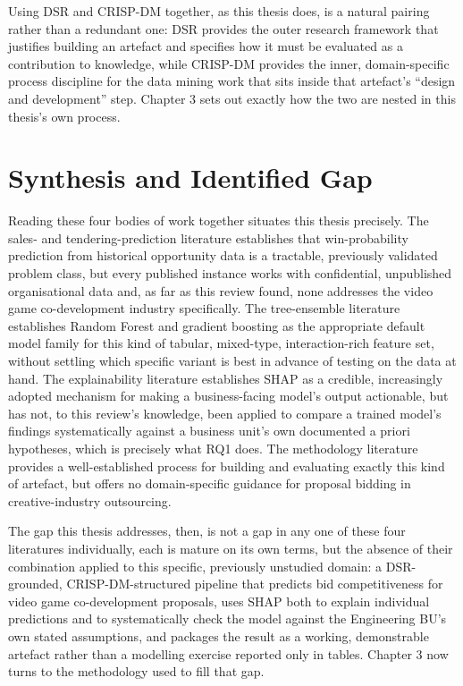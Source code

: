 Using DSR and CRISP-DM together, as this thesis does, is a natural
pairing rather than a redundant one: DSR provides the outer research
framework that justifies building an artefact and specifies how it must
be evaluated as a contribution to knowledge, while CRISP-DM provides the
inner, domain-specific process discipline for the data mining work that
sits inside that artefact's ``design and development'' step. Chapter 3
sets out exactly how the two are nested in this thesis's own process.

\hypertarget{synthesis-and-identified-gap}{%
\section{Synthesis and Identified
Gap}\label{synthesis-and-identified-gap}}

Reading these four bodies of work together situates this thesis
precisely. The sales- and tendering-prediction literature
\citep{yan2015sales, zahid2021predicting, rezazadeh2020generalized}
establishes that win-probability prediction from historical opportunity
data is a tractable, previously validated problem class, but every
published instance works with confidential, unpublished organisational
data and, as far as this review found, none addresses the video game
co-development industry specifically. The tree-ensemble literature
\citep{breiman2001random, friedman2001greedy, chen2016xgboost}
establishes Random Forest and gradient boosting as the appropriate
default model family for this kind of tabular, mixed-type,
interaction-rich feature set, without settling which specific variant is
best in advance of testing on the data at hand. The explainability
literature \citep{lundberg2017unified, olan2024enabling} establishes
SHAP as a credible, increasingly adopted mechanism for making a
business-facing model's output actionable, but has not, to this review's
knowledge, been applied to compare a trained model's findings
systematically against a business unit's own documented a priori
hypotheses, which is precisely what RQ1 does. The methodology literature
\citep{hevner2004design, peffers2007design, chapman2000crispdm, schroer2021systematic}
provides a well-established process for building and evaluating exactly
this kind of artefact, but offers no domain-specific guidance for
proposal bidding in creative-industry outsourcing.

The gap this thesis addresses, then, is not a gap in any one of these
four literatures individually, each is mature on its own terms, but the
absence of their combination applied to this specific, previously
unstudied domain: a DSR-grounded, CRISP-DM-structured pipeline that
predicts bid competitiveness for video game co-development proposals,
uses SHAP both to explain individual predictions and to systematically
check the model against the Engineering BU's own stated assumptions, and
packages the result as a working, demonstrable artefact rather than a
modelling exercise reported only in tables. Chapter 3 now turns to the
methodology used to fill that gap.
